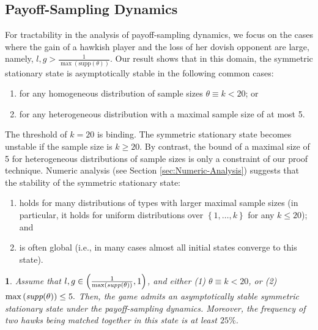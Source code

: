 \documentclass[12pt]{article}
\numberwithin{equation}{section}
\numberwithin{figure}{section}
\theoremstyle{definition}
\theoremstyle{plain}
\theoremstyle{plain}
\theoremstyle{plain}
\newtheorem{thm}{\protect\theoremname}
\theoremstyle{remark}
\theoremstyle{plain}
\theoremstyle{plain}
\providecommand{\theoremname}{Theorem}
\begin{document}
\subsection{Payoff-Sampling
Dynamics\label{subsec:Stability-of-symmetric-payoff-dynamics}}
For tractability in the analysis of payoff-sampling dynamics, we focus on the cases where the gain of a hawkish player and the loss of her dovish opponent are large, namely, $l,g>\frac{1}{\max (\textrm{supp}(\theta))}$. Our result shows that in this domain, the symmetric stationary state 
is asymptotically
stable in the following common cases:
\begin{enumerate}
\item for any homogeneous  distribution of sample sizes $\theta\equiv k<20$; or
\item for any heterogeneous distribution with a maximal sample size of at most 5.
\end{enumerate}
The threshold of $k=20$ is binding. The symmetric stationary state becomes unstable if the sample size is $k \geq 20.$ By contrast, the bound of a maximal size of 5 for heterogeneous distributions of sample sizes is only a constraint of our proof technique. Numeric analysis (see Section \ref{sec:Numeric-Analysis}) suggests that the stability of the symmetric stationary state:
\begin{enumerate}
    \item holds for many distributions of types with larger maximal sample sizes (in particular, it holds for uniform distributions over 
$\left\{ 1,\dots,k\right\} $ for any $k\leq20$); and
    \item is often global (i.e., in many cases almost all initial states converge to this state).
\end{enumerate}
\begin{thm}\label{thm:stableinterior_PSD}
Assume that $l,g\in\left(\frac{1}{\max\left(\emph{supp}(\theta\right))},1\right)$, and either (1) $\theta\equiv k<20$, or (2) $\max\left(\emph{supp}(\theta\right))\leq5.$ Then, the game admits an asymptotically stable symmetric stationary state 
under the payoff-sampling dynamics. Moreover, the frequency of two hawks being matched together in this state is at least $25\%$.
\end{thm}
\end{document}
